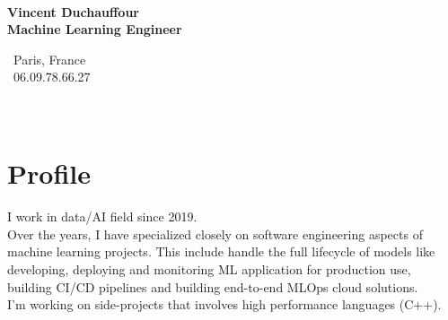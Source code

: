 \documentclass[a4paper,10pt]{article}
\begin{document}
\thispagestyle{empty}


\begin{adjustbox}{valign=t}
    \begin{minipage}{0.32\textwidth}
        \begin{center}
            {\Large \bfseries \\Vincent Duchauffour}\\
            {\large \bfseries Machine Learning Engineer}\\[1cm]
            \raggedright
            \vspace{-.5cm}
            \faHome~Paris, France\\
            \faPhone~06.09.78.66.27\\
            \textcolor{ColorTwo}{\faEnvelopeO}
            \\
            \textcolor{ColorTwo}{\faLinkedin}
            \\
            \textcolor{ColorTwo}{\faGithub}
        \end{center}
        \vspace{-.5cm}
        \section*{Profile}
        \justifying
        I work in data/AI field since 2019. \\Over the years, I have specialized closely on software engineering aspects of machine learning projects. This include handle the full lifecycle of models like developing, deploying and monitoring ML application for production use, building CI/CD pipelines and building end-to-end MLOps cloud solutions. \\I'm working on side-projects that involves high performance languages (C++).
        \vspace{-.5cm}

\end{minipage}
\end{adjustbox}
\end{document}
